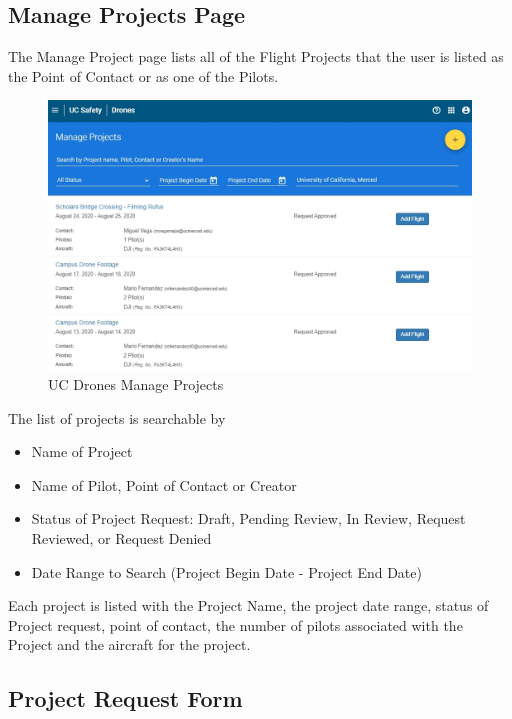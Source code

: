 \documentclass[
  12pt,
]{book}
\providecommand{\tightlist}{%
  \setlength{\itemsep}{0pt}\setlength{\parskip}{0pt}}
\begin{document}
\subsection{Manage Projects Page}\label{manage-projects-page}

The Manage Project page lists all of the Flight Projects that the user is listed as the Point of Contact or as one of the Pilots.

\begin{figure}

{\centering \includegraphics[width=0.85\linewidth]{images/UCDrones_manage_project} 

}

\caption{UC Drones Manage Projects}\label{fig:UCDrones-project}
\end{figure}

The list of projects is searchable by

\begin{itemize}
\tightlist
\item
  Name of Project
\item
  Name of Pilot, Point of Contact or Creator
\item
  Status of Project Request: Draft, Pending Review, In Review, Request Reviewed, or Request Denied
\item
  Date Range to Search (Project Begin Date - Project End Date)
\end{itemize}

Each project is listed with the Project Name, the project date range, status of Project request, point of contact, the number of pilots associated with the Project and the aircraft for the project.

\subsection{Project Request Form}\label{project-request-form}
\end{document}
